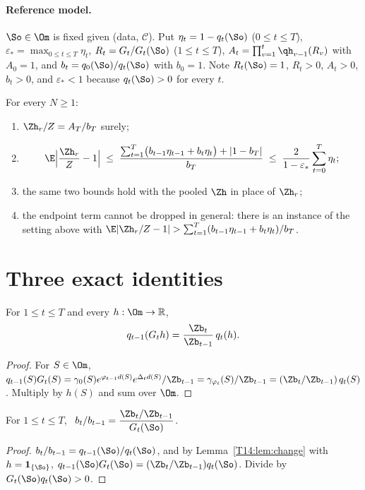 \documentclass[11pt]{report}
\begin{document}
\paragraph{Reference model.} $\So\in\Om$ is fixed given (data, $\mathcal C$). Put
$\eta_t=1-q_t(\So)$ ($0\le t\le T$), $\varepsilon_*=\max_{0\le t\le T}\eta_t$,
$R_t=G_t/G_t(\So)$ ($1\le t\le T$), $A_t=\prod_{v=1}^t\qh_{v-1}(R_v)$ with $A_0=1$, and $b_t=q_0(\So)/q_t(\So)$ with
$b_0=1$. Note $R_t(\So)=1$, $R_t>0$, $A_t>0$, $b_t>0$, and $\varepsilon_*<1$ because $q_t(\So)>0$ for every $t$.

\begin{T14theorem}[T14(i)]\label{T14:thm:main}
For every $N\ge1$:
\begin{enumerate}[label=(i-\alph*)]
\item $\Zh_r/Z=A_T/b_T$ surely;
\item
  \[
  \E\Bigl|\frac{\Zh_r}{Z}-1\Bigr|\;\le\;\frac{\sum_{t=1}^T\bigl(b_{t-1}\eta_{t-1}+b_t\eta_t\bigr)+|1-b_T|}{b_T}
  \;\le\;\frac{2}{1-\varepsilon_*}\sum_{t=0}^T\eta_t ;
  \]
\item the same two bounds hold with the pooled $\Zh$ in place of $\Zh_r$;
\item the endpoint term cannot be dropped in general: there is an instance of the setting above with
  $\E|\Zh_r/Z-1|>\sum_{t=1}^T(b_{t-1}\eta_{t-1}+b_t\eta_t)/b_T$.
\end{enumerate}
\end{T14theorem}

\section{Three exact identities}

\begin{T14lemma}\label{T14:lem:change}
For $1\le t\le T$ and every $h:\Om\to\mathbb R$,
\[
q_{t-1}(G_t h)=\frac{\Zb_t}{\Zb_{t-1}}\,q_t(h).
\]
\end{T14lemma}
\begin{proof}
For $S\in\Om$,
$q_{t-1}(S)G_t(S)=\gamma_0(S)e^{\varphi_{t-1}d(S)}e^{\Delta_t d(S)}/\Zb_{t-1}=\gamma_{\varphi_t}(S)/\Zb_{t-1}
=(\Zb_t/\Zb_{t-1})\,q_t(S)$. Multiply by $h(S)$ and sum over $\Om$.
\end{proof}

\begin{T14lemma}\label{T14:lem:b}
For $1\le t\le T$, \ $b_t/b_{t-1}=\dfrac{\Zb_t/\Zb_{t-1}}{G_t(\So)}$.
\end{T14lemma}
\begin{proof}
$b_t/b_{t-1}=q_{t-1}(\So)/q_t(\So)$, and by Lemma~\ref{T14:lem:change} with $h=\mathbf 1_{\{\So\}}$,
$q_{t-1}(\So)G_t(\So)=(\Zb_t/\Zb_{t-1})q_t(\So)$. Divide by $G_t(\So)q_t(\So)>0$.
\end{proof}
\end{document}
